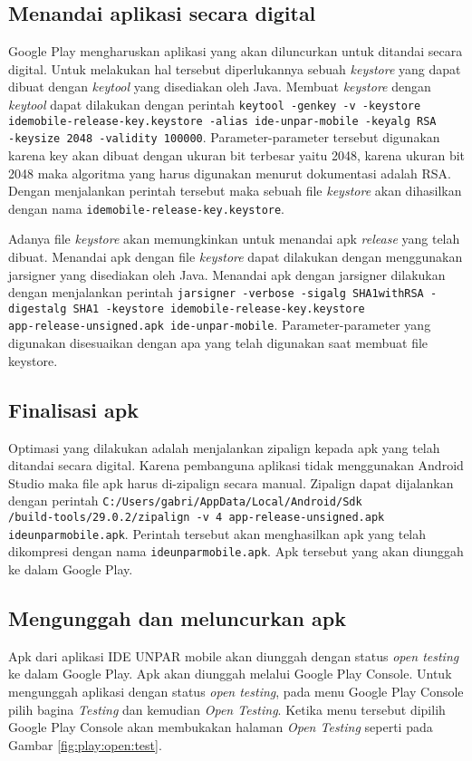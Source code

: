 \subsection{Menandai aplikasi secara digital}
Google Play mengharuskan aplikasi yang akan diluncurkan untuk ditandai secara digital. Untuk melakukan hal tersebut diperlukannya sebuah \textit{keystore} yang dapat dibuat dengan \textit{keytool} yang disediakan oleh Java. Membuat \textit{keystore} dengan \textit{keytool} dapat dilakukan dengan perintah \texttt{keytool -genkey -v -keystore idemobile-release-key.keystore -alias ide-unpar-mobile -keyalg RSA \\ -keysize 2048 -validity 100000}. Parameter-parameter tersebut digunakan karena key akan dibuat dengan ukuran bit terbesar yaitu 2048, karena ukuran bit 2048 maka algoritma yang harus digunakan menurut dokumentasi adalah RSA. Dengan menjalankan perintah tersebut maka sebuah file \textit{keystore} akan dihasilkan dengan nama \texttt{idemobile-release-key.keystore}.

Adanya file \textit{keystore} akan memungkinkan untuk menandai apk \textit{release} yang telah dibuat. Menandai apk dengan file \textit{keystore} dapat dilakukan dengan menggunakan jarsigner yang disediakan oleh Java. Menandai apk dengan jarsigner dilakukan dengan menjalankan perintah \texttt{jarsigner -verbose -sigalg SHA1withRSA -digestalg SHA1 -keystore idemobile-release-key.keystore \\ app-release-unsigned.apk ide-unpar-mobile}. Parameter-parameter yang digunakan disesuaikan dengan apa yang telah digunakan saat membuat file keystore.

\subsection{Finalisasi apk}
Optimasi yang dilakukan adalah menjalankan zipalign kepada apk yang telah ditandai secara digital. Karena pembanguna aplikasi tidak menggunakan Android Studio maka file apk harus di-zipalign secara manual. Zipalign dapat dijalankan dengan perintah \texttt{C:/Users/gabri/AppData/Local/Android/Sdk\\/build-tools/29.0.2/zipalign -v 4 app-release-unsigned.apk ideunparmobile.apk}. Perintah tersebut akan menghasilkan apk yang telah dikompresi dengan nama \texttt{ideunparmobile.apk}. Apk tersebut yang akan diunggah ke dalam Google Play.

\subsection{Mengunggah dan meluncurkan apk}
Apk dari aplikasi IDE UNPAR mobile akan diunggah dengan status \textit{open testing} ke dalam Google Play. Apk akan diunggah melalui Google Play Console. Untuk mengunggah aplikasi dengan status \textit{open testing}, pada menu Google Play Console pilih bagina \textit{Testing} dan kemudian \textit{Open Testing}. Ketika menu tersebut dipilih Google Play Console akan membukakan halaman \textit{Open Testing} seperti pada Gambar \ref{fig:play:open:test}. 

